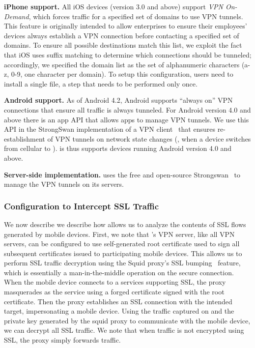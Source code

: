 \noindent\textbf{iPhone support.} 
All iOS devices (version 3.0 and above) support \textit{VPN On-Demand}, which forces traffic for a specified set of domains to use VPN tunnels. 
This feature is originally intended to allow enterprises to ensure their employees' devices always establish a VPN connection before contacting a specified set of domains. 
To ensure all possible destinations match this list, we exploit the fact that iOS uses suffix matching to determine which connections should be tunneled; accordingly, we specified the domain list as the set of alphanumeric characters (a-z, 0-9, one character per domain). 
To setup this configuration, users need to install a single file, a step that needs to be performed only once. 

\noindent\textbf{Android support.} As of Android 4.2, Android supports ``always on'' VPN connections that ensure all traffic is always tunneled.
For Android version 4.0 and above there is an app API that allows apps to manage VPN tunnels. 
We use this API in the StrongSwan implementation of a VPN client~\cite{strongswanclient} that ensures re-establishment of VPN tunnels on network state changes (\eg, when a device switches from cellular to \wifi).
\meddle is thus supports devices running Android version 4.0 and above.

\noindent\textbf{Server-side implementation.} 
\meddle uses the free and open-source Strongswan~\cite{strongswan} to manage the VPN tunnels on its servers. 

\subsubsection{Configuration to Intercept SSL Traffic}

We now describe we describe how \meddle allows us to analyze the contents of SSL flows generated by mobile devices.
First, we note that \meddle's VPN server, like all VPN servers, can be configured to use self-generated root certificate used to sign all subsequent certificates issued to participating mobile devices. 
This allows us to perform SSL traffic decryption using the Squid proxy's SSL bumping~\cite{sslbump} feature, which is essentially a man-in-the-middle operation on the secure connection.
When the mobile device connects to a services supporting SSL, the proxy masquerades as the service using a forged certificate signed with the \meddle root certificate. 
Then the proxy establishes an SSL connection with the intended target, impersonating a mobile device. 
Using the traffic captured on \meddle and the private key generated by the squid proxy to communicate with the mobile device, we can decrypt all SSL traffic.
We note that when traffic is not encrypted using SSL, the proxy simply forwards traffic. 

